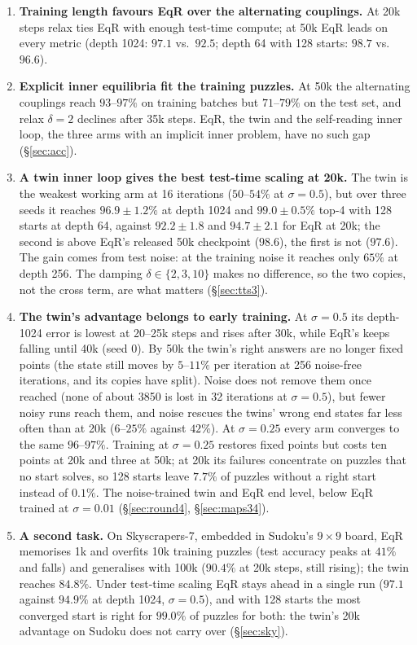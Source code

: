 \documentclass[11pt]{article}
\theoremstyle{definition}
\begin{document}
\begin{enumerate}[leftmargin=*,itemsep=1pt]
and fails, and early-training accuracy improves as the merged-state retention falls from $1$ to $\approx0.2$ (\S\ref{sec:acc}).
\item \textbf{Training length favours EqR over the alternating couplings.} At 20k steps relax ties EqR with enough test-time compute;
at 50k EqR leads on every metric (depth 1024: $97.1$ vs.\ $92.5$; depth 64 with 128 starts: $98.7$ vs.\ $96.6$).
\item \textbf{Explicit inner equilibria fit the training puzzles.} At 50k the alternating couplings reach $93$--$97\%$ on training batches
but $71$--$79\%$ on the test set, and relax $\delta=2$ declines after 35k steps. EqR, the twin and the self-reading inner loop, the three arms
with an implicit inner problem, have no such gap (\S\ref{sec:acc}).
\item \textbf{A twin inner loop gives the best test-time scaling at 20k.} The twin is the weakest working arm at 16 iterations
($50$--$54\%$ at $\sigma=0.5$), but over three seeds it reaches $96.9\pm1.2\%$ at depth 1024 and $99.0\pm0.5\%$ top-4 with 128 starts at
depth 64, against $92.2\pm1.8$ and $94.7\pm2.1$ for EqR at 20k; the second is above EqR's released 50k checkpoint ($98.6$), the first is
not ($97.6$). The gain comes from test noise: at the training noise it reaches only $65\%$ at depth 256. The damping $\delta\in\{2,3,10\}$
makes no difference, so the two copies, not the cross term, are what matters (\S\ref{sec:tts3}).
\item \textbf{The twin's advantage belongs to early training.} At $\sigma=0.5$ its depth-1024 error is lowest at 20--25k steps and rises
after 30k, while EqR's keeps falling until 40k (seed 0). By 50k the twin's right answers are no longer fixed points (the state still moves
by $5$--$11\%$ per iteration at 256 noise-free iterations, and its copies have split). Noise does not remove them once reached (none of
about 3850 is lost in 32 iterations at $\sigma=0.5$), but fewer noisy runs reach them, and noise rescues the twins' wrong end states far less
often than at 20k ($6$--$25\%$ against $42\%$). At $\sigma=0.25$ every arm converges to the same $96$--$97\%$. Training at $\sigma=0.25$
restores fixed points but costs ten points at 20k and three at 50k; at 20k its failures concentrate on puzzles that no start solves, so 128
starts leave $7.7\%$ of puzzles without a right start instead of $0.1\%$. The noise-trained twin and EqR end level, below EqR trained at
$\sigma=0.01$ (\S\ref{sec:round4}, \S\ref{sec:maps34}).
\item \textbf{A second task.} On Skyscrapers-7, embedded in Sudoku's $9\times9$ board, EqR memorises 1k and overfits 10k training puzzles
(test accuracy peaks at $41\%$ and falls) and generalises with 100k ($90.4\%$ at 20k steps, still rising); the twin reaches $84.8\%$.
Under test-time scaling EqR stays ahead in a single run ($97.1$ against $94.9\%$ at depth 1024, $\sigma=0.5$), and with 128 starts the most
converged start is right for $99.0\%$ of puzzles for both: the twin's 20k advantage on Sudoku does not carry over (\S\ref{sec:sky}).
\end{enumerate}
\end{document}
